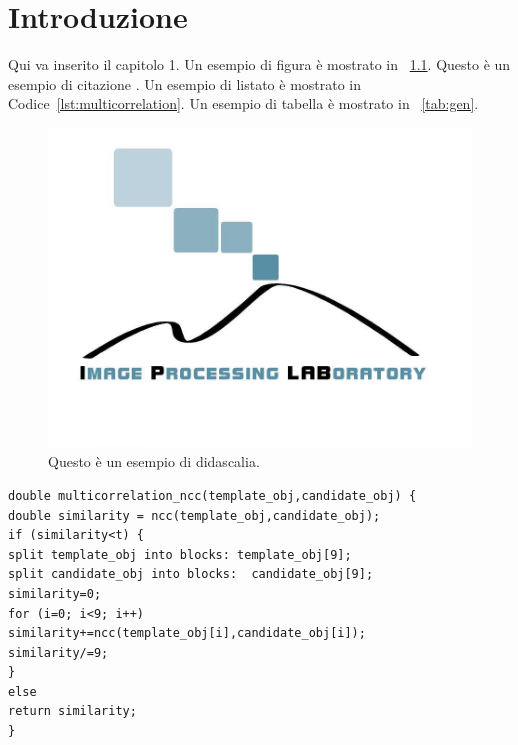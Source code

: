 \chapter{Introduzione}
Qui va inserito il capitolo 1. Un esempio di figura è mostrato in \figurename{~\ref{fig:immagine}}. Questo è un esempio di citazione \cite{iplab}. Un esempio di listato è mostrato in Codice~\ref{lst:multicorrelation}. Un esempio di tabella è mostrato in \tablename~\ref{tab:gen}.

\begin{figure}[t] %
	\includegraphics[width=1\linewidth]{Images/iplab} %
	\caption{Questo è un esempio di didascalia.}
	\label{fig:immagine} %
\end{figure}


\begin{lstlisting}[caption={Didascalia},label=lst:multicorrelation]
double multicorrelation_ncc(template_obj,candidate_obj) {
double similarity = ncc(template_obj,candidate_obj);
if (similarity<t) {
split template_obj into blocks: template_obj[9];
split candidate_obj into blocks:  candidate_obj[9];
similarity=0;
for (i=0; i<9; i++)
similarity+=ncc(template_obj[i],candidate_obj[i]);
similarity/=9;
}
else
return similarity;
}
\end{lstlisting}

